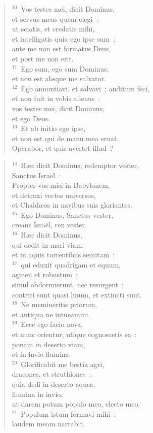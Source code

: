\begin{verse}
${}^{10}$~Vos testes mei, dicit Dominus,\\ et servus meus quem elegi~:\\ ut sciatis, et credatis mihi,\\ et intelligatis quia ego ipse sum~;\\ ante me non est formatus Deus,\\ et post me non erit.\\
${}^{11}$~Ego sum, ego sum Dominus,\\ et non est absque me salvator.\\
${}^{12}$~Ego annuntiavi, et salvavi~; auditum feci,\\ et non fuit in vobis alienus~:\\ vos testes mei, dicit Dominus,\\ et ego Deus.\\
${}^{13}$~Et ab initio ego ipse,\\ et non est qui de manu mea eruat.\\ Operabor, et quis avertet illud~?\end{verse}


\begin{verse}${}^{14}$~H\ae c dicit Dominus, redemptor vester,\\ Sanctus Isra\"el~:\\ Propter vos misi in Babylonem,\\ et detraxi vectes universos,\\ et Chald\ae os in navibus suis gloriantes.\\
${}^{15}$~Ego Dominus, Sanctus vester,\\ creans Isra\"el, rex vester.\\
${}^{16}$~H\ae c dicit Dominus,\\ qui dedit in mari viam,\\ et in aquis torrentibus semitam~;\\
${}^{17}$~qui eduxit quadrigam et equum,\\ agmen et robustum~:\\ simul obdormierunt, nec resurgent~;\\ contriti sunt quasi linum, et extincti sunt.\\
${}^{18}$~Ne memineritis priorum,\\ et antiqua ne intueamini.\\
${}^{19}$~Ecce ego facio nova,\\ et nunc orientur, utique cognoscetis ea~:\\ ponam in deserto viam,\\ et in invio flumina.\\
${}^{20}$~Glorificabit me bestia agri,\\ dracones, et struthiones~:\\ quia dedi in deserto aquas,\\ flumina in invio,\\ ut darem potum populo meo, electo meo.\\
${}^{21}$~Populum istum formavi mihi~:\\ laudem meam narrabit.\end{verse}


